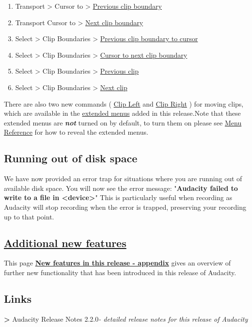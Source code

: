 \begin{multicols}{2}
\begin{enumerate}
\item Transport > Cursor to > 
\hyperref[\foo{transport:menu:cursor:to:previous:clip:boundary}]{Previous clip boundary}

\item Transport Cursor to > 
\hyperref[\foo{transport:menu:cursor:to:next:clip:boundary}]{Next clip boundary}

\item Select > Clip Boundaries > 
\hyperref[\foo{select:menu:clip:boundaries:previous:clip:boundary:to:cursor}]{Previous clip boundary to cursor}

\item Select > Clip Boundaries > 
\hyperref[\foo{select:menu:clip:boundaries:cursor:to:next:clip:boundary}]{Cursor to next clip boundary}

\item Select > Clip Boundaries > 
\hyperref[\foo{select:menu:clip:boundaries:previous:clip}]{Previous clip}

\item Select > Clip Boundaries > 
\hyperref[\foo{select:menu:clip:boundaries:next:clip}]{Next clip}

\end{enumerate}
There are also two new commands (
\hyperref[\foo{ext:command:menu:cursor:clip:left}]{Clip Left}
 and 
\hyperref[\foo{ext:command:menu:cursor:clip:right}]{Clip Right}
) for moving clips, which are available in the 
\hyperref[\foo{new:features:in:this:release::extendedmenubar}]{extended menus}
 added in this release.Note that these extended menus are \textit{\textbf{not}} turned on by default, to turn them on please see 
\hyperref[\foo{menu:reference:the:extended:menu:bar}]{Menu Reference}
 for how to reveal the extended menus.
\subsection{Running out of disk space}
\label{new:features:in:this:release:safety}We have now provided an error trap for situations where you are running out of available disk space.
You will now see the error message:
"\textbf{Audacity failed to write to a file in <device>}"
This is particularly useful when recording as Audacity will stop recording when the error is trapped, preserving your recording up to that point.

\subsection{
\hyperref[\foo{new:features:in:this:release:appendix:}]{Additional new features}
}
\label{new:features:in:this:release:appendix}This page \textbf{
\hyperref[\foo{new:features:in:this:release:appendix:}]{New features in this release - appendix}
} gives an overview of further new functionality that has been introduced in this release of Audacity.

\subsection{Links}\textbf{>} Audacity Release Notes 2.2.0\textit{- detailed release notes for this release of Audacity}\end{multicols}